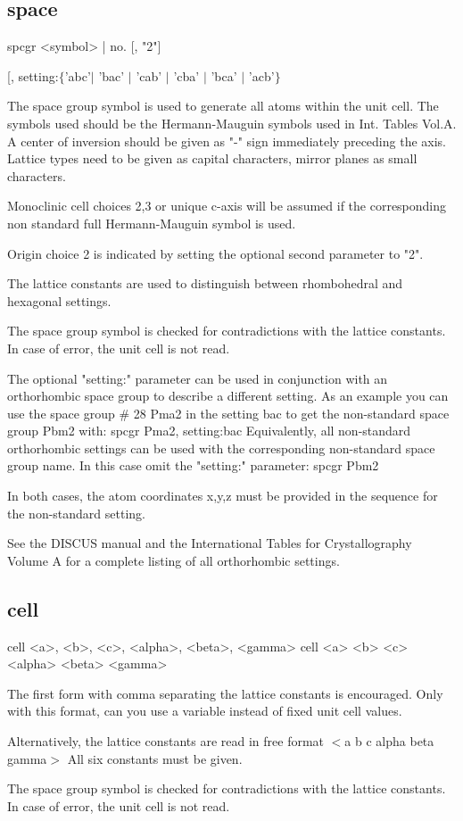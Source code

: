 \subsection*{space}
\begin{MacVerbatim}
spcgr {<symbol> | no. } [, "2"]
\end{MacVerbatim}
[, setting:$ \{$'abc'$| $ 'bac' $| $ 'cab' $| $ 'cba' $| $ 'bca' $| $ 'acb'$\} $ 
\par
The space group symbol is used to generate all atoms within the unit 
cell. The symbols used should be the Hermann-Mauguin symbols used in 
Int. Tables Vol.A. A center of inversion should be given as "-" sign 
immediately preceding the axis. Lattice types need to be given as 
capital characters, mirror planes as small characters. 
\par
Monoclinic cell choices 2,3 or unique c-axis will be assumed if the 
corresponding non standard full Hermann-Mauguin symbol is used. 
\par
Origin choice 2 is indicated by setting the optional second parameter 
to "2". 
\par
The lattice constants are used to distinguish between rhombohedral 
and hexagonal settings. 
\par
The space group symbol is checked for contradictions with the lattice 
constants. In case of error, the unit cell is not read. 
\par
The optional "setting:" parameter can be used in conjunction with an 
orthorhombic space group to describe a different setting. As an example 
you can use the space group \# 28 Pma2 in the setting bac to get the 
non-standard space group Pbm2 with: 
spcgr Pma2, setting:bac 
Equivalently, all non-standard orthorhombic settings can be used 
with the corresponding non-standard space group name. In this case 
omit the "setting:" parameter: 
spcgr Pbm2 
\par
In both cases, the atom coordinates x,y,z must be provided in the 
sequence for the non-standard setting. 
\par
See the DISCUS manual and the International Tables for 
Crystallography Volume A for a complete listing of all 
orthorhombic settings. 
\subsection*{cell}
\begin{MacVerbatim}
cell  <a>,  <b>,  <c>, <alpha>,  <beta>,  <gamma>
cell  <a>   <b>   <c>  <alpha>   <beta>   <gamma>
\end{MacVerbatim}
The first form with comma separating the lattice constants is 
encouraged. Only with this format, can you use a variable instead 
of fixed unit cell values. 
\par
Alternatively, the lattice constants are read in free format 
$ <$a b c alpha beta gamma$> $ 
All six constants must be given. 
\par
The space group symbol is checked for contradictions with the lattice 
constants. In case of error, the unit cell is not read. 
